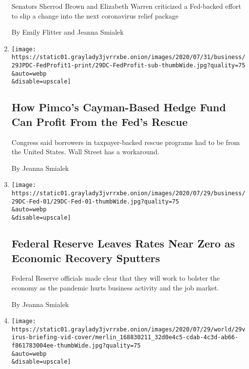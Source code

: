 \begin{enumerate}
  Senators Sherrod Brown and Elizabeth Warren criticized a Fed-backed
  effort to slip a change into the next coronavirus relief package

  By Emily Flitter and Jeanna Smialek
\item
  \href{/2020/07/30/business/economy/fed-talf-wall-street.html}{}

  \texttt{[image: https://static01.graylady3jvrrxbe.onion/images/2020/07/31/business/29JPDC-FedProfit1-print/29DC-FedProfit-sub-thumbWide.jpg?quality=75\\\&auto=webp\\\&disable=upscale]}

  \hypertarget{how-pimcos-cayman-based-hedge-fund-can-profit-from-the-feds-rescue}{%
  \subsection{How Pimco's Cayman-Based Hedge Fund Can Profit From the
  Fed's
  Rescue}\label{how-pimcos-cayman-based-hedge-fund-can-profit-from-the-feds-rescue}}

  Congress said borrowers in taxpayer-backed rescue programs had to be
  from the United States. Wall Street has a workaround.

  By Jeanna Smialek
\item
  \href{/2020/07/29/business/economy/federal-reserve-meeting-interest-rates.html}{}

  \texttt{[image: https://static01.graylady3jvrrxbe.onion/images/2020/07/29/business/29DC-Fed-01/29DC-Fed-01-thumbWide.jpg?quality=75\\\&auto=webp\\\&disable=upscale]}

  \hypertarget{federal-reserve-leaves-rates-near-zero-as-economic-recovery-sputters}{%
  \subsection{Federal Reserve Leaves Rates Near Zero as Economic
  Recovery
  Sputters}\label{federal-reserve-leaves-rates-near-zero-as-economic-recovery-sputters}}

  Federal Reserve officials made clear that they will work to bolster
  the economy as the pandemic hurts business activity and the job
  market.

  By Jeanna Smialek
\item
  \href{/live/2020/07/29/business/stock-market-today-coronavirus/5-takeaways-from-wednesdays-fed-meeting-and-news-conference}{}

  \texttt{[image: https://static01.graylady3jvrrxbe.onion/images/2020/07/29/world/29virus-briefing-vid-cover/merlin\_168830211\_32d0e4c5-cdab-4c3d-ab66-f861783004ee-thumbWide.jpg?quality=75\\\&auto=webp\\\&disable=upscale]}


\end{enumerate}
